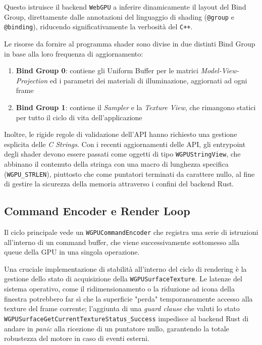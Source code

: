 \documentclass[a4paper, 11pt, twoside]{report}
\begin{document}
Questo istruisce il backend \texttt{WebGPU} a inferire dinamicamente il layout del Bind Group, direttamente dalle
annotazioni del linguaggio di shading (\texttt{@group} e \texttt{@binding}), riducendo significativamente la verbosità
del \texttt{C++}.

Le risorse da fornire al programma shader sono divise in due distinti Bind Group in base alla loro frequenza di
aggiornamento:

\begin{enumerate}
    \item \textbf{Bind Group 0}: contiene gli Uniform Buffer per le matrici \textit{Model-View-Projection} ed i
        parametri dei materiali di illuminazione, aggiornati ad ogni frame
    \item \textbf{Bind Group 1}: contiene il \textit{Sampler} e la \textit{Texture View}, che rimangono statici per
        tutto il ciclo di vita dell'applicazione
\end{enumerate}

Inoltre, le rigide regole di validazione dell'API hanno richiesto una gestione esplicita delle \textit{C Strings}.
Con i recenti aggiornamenti delle API, gli entrypoint degli shader devono essere passati come oggetti di tipo
\texttt{WGPUStringView}, che abbinano il contenuto della stringa con una macro di lunghezza specifica
(\texttt{WGPU\_STRLEN}), piuttosto che come puntatori terminati da carattere nullo, al fine di gestire la sicurezza
della memoria attraverso i confini del backend Rust.

\subsection{Command Encoder e Render Loop}

Il ciclo principale vede un \texttt{WGPUCommandEncoder} che registra una serie di istruzioni all'interno di un command
buffer, che viene successivamente sottomesso alla queue della GPU in una singola operazione.

Una cruciale implementazione di stabilità all'interno del ciclo di rendering è la gestione dello stato di acquisizione
della \texttt{WGPUSurfaceTexture}. Le latenze del sistema operativo, come il ridimensionamento o la riduzione ad icona
della finestra potrebbero far sì che la superficie "perda" temporaneamente accesso alla texture del frame corrente;
l'aggiunta di una \textit{guard clause} che valuti lo stato \texttt{WGPUSurfaceGetCurrentTextureStatus\_Success}
impedisce al backend Rust di andare in \textit{panic} alla ricezione di un puntatore nullo, garantendo la totale
robustezza del motore in caso di eventi esterni.
\end{document}
